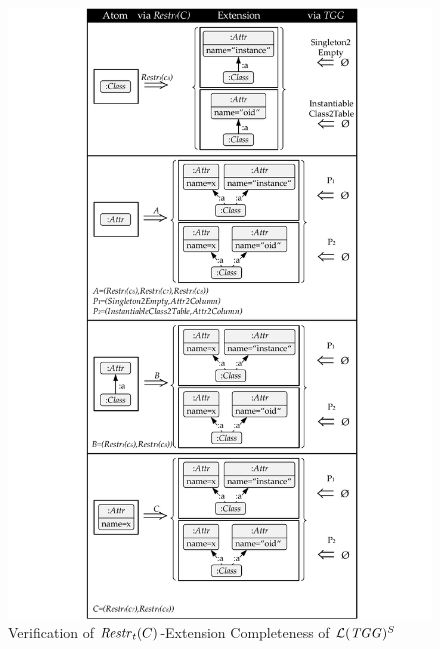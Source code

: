 \begin{figure}[!tb]
\begin{center}
\includegraphics[width=\textwidth]{img/domain_mt/ext.pdf}
\end{center}
\caption{Verification of $\mathit{Restr}_t(C)$-Extension Completeness of $\mathcal{L}(\mathit{TGG})^S$}
\label{fig:sec-dom-compl-mt:ext}
\end{figure}


